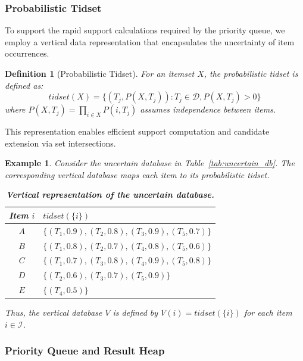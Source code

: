 \documentclass[10pt,letterpaper]{article}
\newtheorem{definition}{Definition}[section]
\newtheorem{example}{Example}[section]
\newcounter{definition}
\newcounter{example}
\begin{document}
\subsubsection*{Probabilistic Tidset}
\label{subsubsec:ptidset}

To support the rapid support calculations required by the priority queue, we employ a vertical data representation that encapsulates the uncertainty of item occurrences.

\begin{definition}[Probabilistic Tidset]
\label{def:ptidset}
For an itemset $X$, the probabilistic tidset is defined as:
\begin{equation}
\mathit{tidset}(X) = \{(T_j, P(X, T_j)) : T_j \in \mathcal{D}, P(X, T_j) > 0\}
\end{equation}
where $P(X, T_j) = \prod_{i \in X} P(i, T_j)$ assumes independence between items.
\end{definition}

This representation enables efficient support computation and candidate extension via set intersections.

\begin{example}
\label{ex:vertical_db}
Consider the uncertain database in Table~\ref{tab:uncertain_db}. The corresponding vertical database maps each item to its probabilistic tidset.

\begin{table}[!ht]
\caption{\bf Vertical representation of the uncertain database.}
\label{tab:vertical_db}
\centering
\begin{tabular}{c l}
\hline
\textbf{Item $i$} & $\mathit{tidset}(\{i\})$ \\
\hline
$A$ & $\{(T_1,0.9),(T_2,0.8),(T_3,0.9),(T_5,0.7)\}$ \\
$B$ & $\{(T_1,0.8),(T_2,0.7),(T_4,0.8),(T_5,0.6)\}$ \\
$C$ & $\{(T_1,0.7),(T_3,0.8),(T_4,0.9),(T_5,0.8)\}$ \\
$D$ & $\{(T_2,0.6),(T_3,0.7),(T_5,0.9)\}$ \\
$E$ & $\{(T_4,0.5)\}$ \\
\hline
\end{tabular}
\end{table}

Thus, the vertical database $V$ is defined by $V(i)=\mathit{tidset}(\{i\})$ for each item $i\in\mathcal{I}$.
\end{example}

\subsubsection*{Priority Queue and Result Heap}
\end{document}
